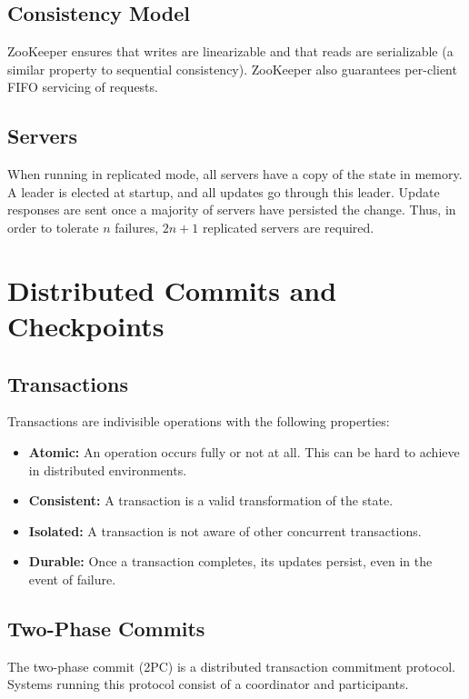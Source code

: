 \documentclass[12pt,titlepage]{article}
\let\stdsection\section
\renewcommand\section{\clearpage\stdsection}
\begin{document}
    \subsection{Consistency Model}
      ZooKeeper ensures that writes are linearizable and that reads are serializable (a similar property to sequential consistency).
      ZooKeeper also guarantees per-client FIFO servicing of requests.

    \subsection{Servers}
      When running in replicated mode, all servers have a copy of the state in memory. A leader is elected at startup, and all updates go
      through this leader. Update responses are sent once a majority of servers have persisted the change. Thus, in order to tolerate $n$
      failures, $2n + 1$ replicated servers are required.

  \section{Distributed Commits and Checkpoints}

    \subsection{Transactions}
      Transactions are indivisible operations with the following properties:
      \begin{itemize}
        \item \textbf{Atomic:} An operation occurs fully or not at all. This can be hard to achieve in distributed environments.
        \item \textbf{Consistent:} A transaction is a valid transformation of the state.
        \item \textbf{Isolated:} A transaction is not aware of other concurrent transactions.
        \item \textbf{Durable:} Once a transaction completes, its updates persist, even in the event of failure.
      \end{itemize}

    \subsection{Two-Phase Commits}
      The two-phase commit (2PC) is a distributed transaction commitment protocol. Systems running this protocol consist of a coordinator
      and participants.
\end{document}
